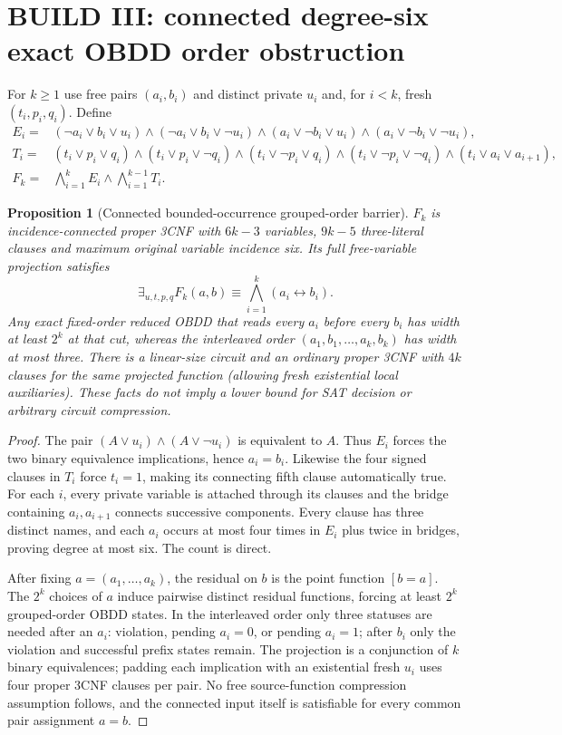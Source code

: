 \documentclass[11pt]{article}
\newtheorem{proposition}[theorem]{Proposition}
\begin{document}
\section{BUILD III: connected degree-six exact OBDD order obstruction}
For $k\ge1$ use free pairs $(a_i,b_i)$ and distinct private $u_i$ and, for $i<k$, fresh $(t_i,p_i,q_i)$. Define
\begin{align*}
 E_i={}&(\neg a_i\vee b_i\vee u_i)\wedge(\neg a_i\vee b_i\vee\neg u_i)
 \wedge(a_i\vee\neg b_i\vee u_i)\wedge(a_i\vee\neg b_i\vee\neg u_i),\\
 T_i={}&(t_i\vee p_i\vee q_i)\wedge(t_i\vee p_i\vee\neg q_i)
 \wedge(t_i\vee\neg p_i\vee q_i)\wedge(t_i\vee\neg p_i\vee\neg q_i)
 \wedge(t_i\vee a_i\vee a_{i+1}),\\
 F_k={}&\bigwedge_{i=1}^kE_i\wedge\bigwedge_{i=1}^{k-1}T_i.
\end{align*}
\begin{proposition}[Connected bounded-occurrence grouped-order barrier]
$F_k$ is incidence-connected proper 3CNF with $6k-3$ variables, $9k-5$ three-literal clauses and maximum original variable incidence six. Its full free-variable projection satisfies
\[
 \exists_{u,t,p,q}F_k(a,b)\equiv\bigwedge_{i=1}^k(a_i\leftrightarrow b_i).
\]
Any exact fixed-order reduced OBDD that reads every $a_i$ before every $b_i$ has width at least $2^k$ at that cut, whereas the interleaved order $(a_1,b_1,\ldots,a_k,b_k)$ has width at most three. There is a linear-size circuit and an ordinary proper 3CNF with $4k$ clauses for the same projected function (allowing fresh existential local auxiliaries). These facts do not imply a lower bound for SAT decision or arbitrary circuit compression.
\end{proposition}
\begin{proof}
The pair $(A\vee u_i)\wedge(A\vee\neg u_i)$ is equivalent to $A$. Thus $E_i$ forces the two binary equivalence implications, hence $a_i=b_i$. Likewise the four signed clauses in $T_i$ force $t_i=1$, making its connecting fifth clause automatically true. For each $i$, every private variable is attached through its clauses and the bridge containing $a_i,a_{i+1}$ connects successive components. Every clause has three distinct names, and each $a_i$ occurs at most four times in $E_i$ plus twice in bridges, proving degree at most six. The count is direct.

After fixing $a=(a_1,\ldots,a_k)$, the residual on $b$ is the point function $[b=a]$. The $2^k$ choices of $a$ induce pairwise distinct residual functions, forcing at least $2^k$ grouped-order OBDD states. In the interleaved order only three statuses are needed after an $a_i$: violation, pending $a_i=0$, or pending $a_i=1$; after $b_i$ only the violation and successful prefix states remain. The projection is a conjunction of $k$ binary equivalences; padding each implication with an existential fresh $u_i$ uses four proper 3CNF clauses per pair. No free source-function compression assumption follows, and the connected input itself is satisfiable for every common pair assignment $a=b$.
\end{proof}
\end{document}
